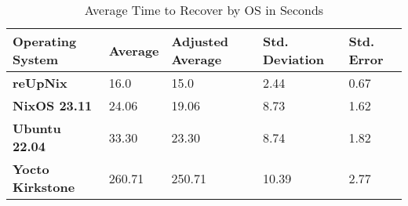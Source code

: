 \begin{table}[H]
	\centering
	\begin{tabular}{l|l|l|l|l}
	\toprule
		Operating System & Average & Adjusted Average\footnote &  Std. Deviation & Std. Error \\
	\midrule
    \textbf{reUpNix} & 16.0 & 15.0 &  2.44 & 0.67 \\
    \textbf{NixOS 23.11} & 24.06 & 19.06 & 8.73 & 1.62 \\
    \textbf{Ubuntu 22.04} & 33.30 & 23.30 & 8.74 & 1.82 \\
    \textbf{Yocto Kirkstone} & 260.71 & 250.71 & 10.39  & 2.77 \\
	\bottomrule
	\end{tabular}
	\caption{Average Time to Recover by OS in Seconds}
	\label{tab:timetorecover}
\end{table}

